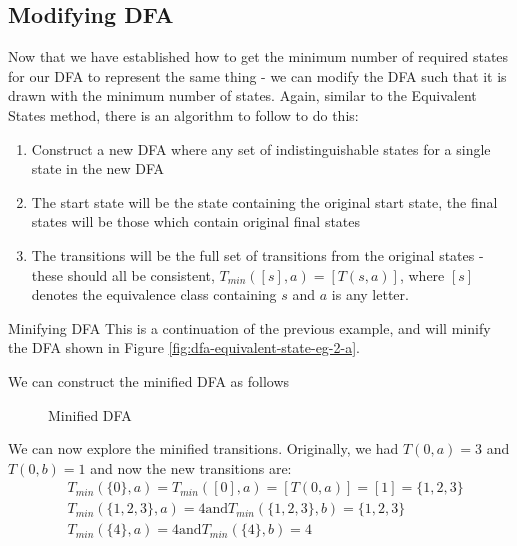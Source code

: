 \subsection{Modifying DFA}
Now that we have established how to get the minimum number of required states for our DFA to represent the same thing - we can modify the DFA such that it is drawn with the minimum number of states. Again, similar to the Equivalent States method, there is an algorithm to follow to do this:

\begin{enumerate}
    \item Construct a new DFA where any set of indistinguishable states for a single state in the new DFA
    \item The start state will be the state containing the original start state, the final states will be those which contain original final states
    \item The transitions will be the full set of transitions from the original states - these should all be consistent, $T_{min}([s],a)=[T(s,a)]$, where $[s]$ denotes the equivalence class containing $s$ and $a$ is any letter.
\end{enumerate}

\begin{example}{Minifying DFA}
This is a continuation of the previous example, and will minify the DFA shown in Figure \ref{fig:dfa-equivalent-state-eg-2-a}. 

We can construct the minified DFA as follows

\begin{figure}[H]
    \centering
    \caption{Minified DFA}
    \label{fig:dfa-minimal-state-eg-1-a}
\end{figure}

We can now explore the minified transitions. Originally, we had $T(0,a)=3$ and $T(0,b)=1$ and now the new transitions are:
\begin{align*}
& T_{min}(\{0\}, a) = T_{min}([0],a) = [T(0,a)] = [1] = \{1,2,3\}\\
& T_{min}(\{1,2,3\},a) = 4 \textrm{and} T_{min}(\{1,2,3\},b) = \{1,2,3\}\\
& T_{min}(\{4\},a) = 4 \textrm{and} T_{min}(\{4\},b) = 4
\end{align*}

\end{example}

